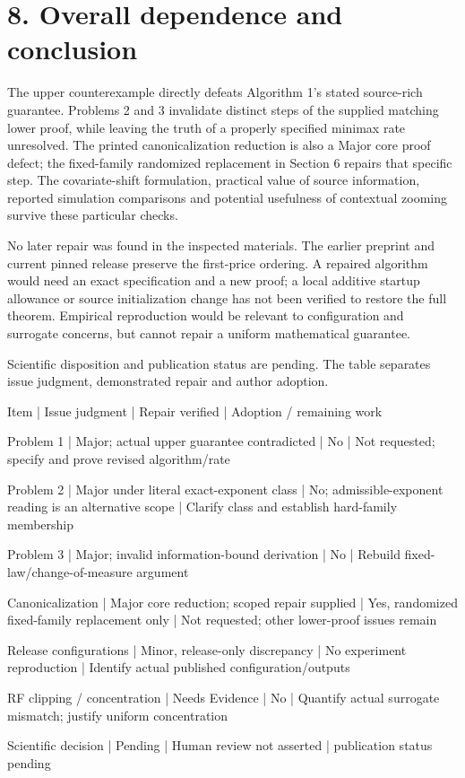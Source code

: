 \documentclass[10pt]{article}
\begin{document}
\section*{8. Overall dependence and conclusion}
The upper counterexample directly defeats Algorithm 1’s stated source-rich guarantee. Problems 2 and 3 invalidate distinct steps of the supplied matching lower proof, while leaving the truth of a properly specified minimax rate unresolved. The printed canonicalization reduction is also a Major core proof defect; the fixed-family randomized replacement in Section 6 repairs that specific step. The covariate-shift formulation, practical value of source information, reported simulation comparisons and potential usefulness of contextual zooming survive these particular checks.\par
No later repair was found in the inspected materials. The earlier preprint and current pinned release preserve the first-price ordering. A repaired algorithm would need an exact specification and a new proof; a local additive startup allowance or source initialization change has not been verified to restore the full theorem. Empirical reproduction would be relevant to configuration and surrogate concerns, but cannot repair a uniform mathematical guarantee.\par
Scientific disposition and publication status are pending. The table separates issue judgment, demonstrated repair and author adoption.\par
Item | Issue judgment | Repair verified | Adoption / remaining work\par
Problem 1 | Major; actual upper guarantee contradicted | No | Not requested; specify and prove revised algorithm/rate\par
Problem 2 | Major under literal exact-exponent class | No; admissible-exponent reading is an alternative scope | Clarify class and establish hard-family membership\par
Problem 3 | Major; invalid information-bound derivation | No | Rebuild fixed-law/change-of-measure argument\par
Canonicalization | Major core reduction; scoped repair supplied | Yes, randomized fixed-family replacement only | Not requested; other lower-proof issues remain\par
Release configurations | Minor, release-only discrepancy | No experiment reproduction | Identify actual published configuration/outputs\par
RF clipping / concentration | Needs Evidence | No | Quantify actual surrogate mismatch; justify uniform concentration\par
Scientific decision | Pending | Human review not asserted | publication status pending\par
\end{document}
